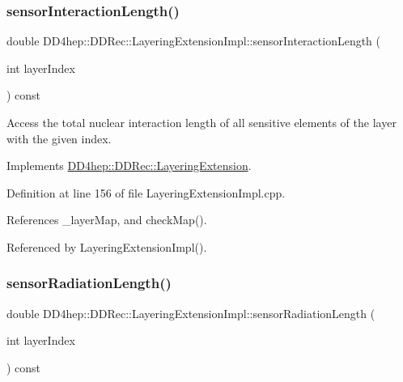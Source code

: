 \subsubsection{\texorpdfstring{sensor\+Interaction\+Length()}{sensorInteractionLength()}}
{\footnotesize\ttfamily double D\+D4hep\+::\+D\+D\+Rec\+::\+Layering\+Extension\+Impl\+::sensor\+Interaction\+Length (\begin{DoxyParamCaption}\item[{int}]{layer\+Index }\end{DoxyParamCaption}) const\hspace{0.3cm}{\ttfamily [virtual]}}



Access the total nuclear interaction length of all sensitive elements of the layer with the given index. 



Implements \hyperlink{class_d_d4hep_1_1_d_d_rec_1_1_layering_extension_a99d3faa45e42d0a34635ea7f3ac2c038}{D\+D4hep\+::\+D\+D\+Rec\+::\+Layering\+Extension}.



Definition at line 156 of file Layering\+Extension\+Impl.\+cpp.



References \+\_\+layer\+Map, and check\+Map().



Referenced by Layering\+Extension\+Impl().

\hypertarget{class_d_d4hep_1_1_d_d_rec_1_1_layering_extension_impl_aa36bb3d1c021159a5d46f84ff84c7a11}{}\label{class_d_d4hep_1_1_d_d_rec_1_1_layering_extension_impl_aa36bb3d1c021159a5d46f84ff84c7a11} 
\subsubsection{\texorpdfstring{sensor\+Radiation\+Length()}{sensorRadiationLength()}}
{\footnotesize\ttfamily double D\+D4hep\+::\+D\+D\+Rec\+::\+Layering\+Extension\+Impl\+::sensor\+Radiation\+Length (\begin{DoxyParamCaption}\item[{int}]{layer\+Index }\end{DoxyParamCaption}) const\hspace{0.3cm}{\ttfamily [virtual]}}



